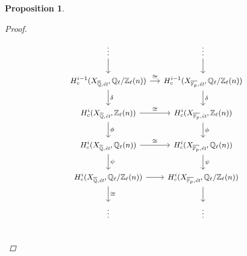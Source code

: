 \documentclass{article}
\newcommand{\FF}{\mathbb{F}}
\newcommand{\QQ}{\mathbb{Q}}
\newcommand{\ZZ}{\mathbb{Z}}
\newtheorem{proposition}[theorem]{Proposition}
\theoremstyle{definition}
\numberwithin{equation}{section}
\begin{document}
\begin{proposition}
\begin{proof}
    \begin{equation}
      \label{eqn:Zl-Ql-Ql/Zl-les}
      \begin{tikzcd}[column sep=small, font=\small]
        \vdots \ar{d} & \vdots \ar{d} \\
        H_c^{i-1} (X_{\overline{\QQ},\text{\it ét}}, \QQ_\ell/\ZZ_\ell (n)) \ar{d}{\delta}\ar{r}{\cong} & H_c^{i-1} (X_{\overline{\FF_p},\text{\it ét}}, \QQ_\ell/\ZZ_\ell (n))  \ar{d}{\delta} \\
        H_c^i (X_{\overline{\QQ},\text{\it ét}}, \ZZ_\ell (n)) \ar{d}{\phi}\ar{r}{\cong} & H_c^i (X_{\overline{\FF_p},\text{\it ét}}, \ZZ_\ell (n)) \ar{d}{\phi} \\
        H_c^i (X_{\overline{\QQ},\text{\it ét}}, \QQ_\ell (n)) \ar{d}{\psi}\ar{r}{\cong} & H_c^i (X_{\overline{\FF_p},\text{\it ét}}, \QQ_\ell (n)) \ar{d}{\psi} \\
        H_c^i (X_{\overline{\QQ},\text{\it ét}}, \QQ_\ell/\ZZ_\ell (n)) \ar{r}\ar{d}{\cong} & H_c^i (X_{\overline{\FF_p},\text{\it ét}}, \QQ_\ell/\ZZ_\ell (n)) \ar{d} \\
        \vdots & \vdots \\
      \end{tikzcd}
\end{equation}


\end{proof}
\end{proposition}
\end{document}
